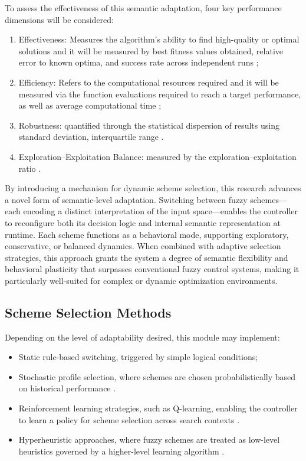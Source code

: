To assess the effectiveness of this semantic adaptation, four key performance dimensions will be considered:
\begin{enumerate}
    \item Effectiveness: Measures the algorithm’s ability to find high-quality or optimal solutions and it will be measured by best fitness values obtained, relative error to known optima, and success rate across independent runs \parencite{halim2021performance};
    \item Efficiency: Refers to the computational resources required and it will be measured via the function evaluations required to reach a target performance, as well as average computational time \parencite{halim2021performance};
    \item Robustness: quantified through the statistical dispersion of results using standard deviation, interquartile range \parencite{djebedjian2021global}.
    \item Exploration–Exploitation Balance: measured by the exploration–exploitation ratio \parencite{crawford2021q}.
\end{enumerate}

By introducing a mechanism for dynamic scheme selection, this research advances a novel form of semantic-level adaptation. Switching between fuzzy schemes—each encoding a distinct interpretation of the input space—enables the controller to reconfigure both its decision logic and internal semantic representation at runtime. Each scheme functions as a behavioral mode, supporting exploratory, conservative, or balanced dynamics. When combined with adaptive selection strategies, this approach grants the system a degree of semantic flexibility and behavioral plasticity that surpasses conventional fuzzy control systems, making it particularly well-suited for complex or dynamic optimization environments.


\subsection{Scheme Selection Methods}

Depending on the level of adaptability desired, this module may implement:
\begin{itemize}
    \item Static rule-based switching, triggered by simple logical conditions\parencite{cord2001genetic};
    \item Stochastic profile selection, where schemes are chosen probabilistically based on historical performance \parencite{qiu2020event, zhu2020event, haighton2024adaptable}.
    \item Reinforcement learning strategies, such as Q-learning, enabling the controller to learn a policy for scheme selection across search contexts  \parencite{qiu2020event, zhu2020event, haighton2024adaptable}.
    \item Hyperheuristic approaches, where fuzzy schemes are treated as low-level heuristics governed by a higher-level learning algorithm \parencite{burke2010classification, crawford2012dynamic}.
\end{itemize}

